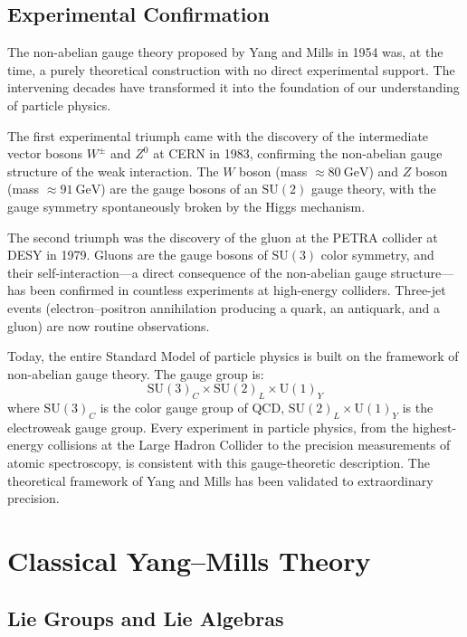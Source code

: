 \subsection{Experimental Confirmation}

The non-abelian gauge theory proposed by Yang and Mills in 1954 was, at the time, a purely theoretical construction with no direct experimental support. The intervening decades have transformed it into the foundation of our understanding of particle physics.

The first experimental triumph came with the discovery of the intermediate vector bosons $W^\pm$ and $Z^0$ at CERN in 1983, confirming the non-abelian gauge structure of the weak interaction. The $W$ boson (mass $\approx 80~\mathrm{GeV}$) and $Z$ boson (mass $\approx 91~\mathrm{GeV}$) are the gauge bosons of an $\mathrm{SU}(2)$ gauge theory, with the gauge symmetry spontaneously broken by the Higgs mechanism.

The second triumph was the discovery of the gluon at the PETRA collider at DESY in 1979. Gluons are the gauge bosons of $\mathrm{SU}(3)$ color symmetry, and their self-interaction---a direct consequence of the non-abelian gauge structure---has been confirmed in countless experiments at high-energy colliders. Three-jet events (electron--positron annihilation producing a quark, an antiquark, and a gluon) are now routine observations.

Today, the entire Standard Model of particle physics is built on the framework of non-abelian gauge theory. The gauge group is:
\[
\mathrm{SU}(3)_C \times \mathrm{SU}(2)_L \times \mathrm{U}(1)_Y
\]
where $\mathrm{SU}(3)_C$ is the color gauge group of QCD, $\mathrm{SU}(2)_L \times \mathrm{U}(1)_Y$ is the electroweak gauge group. Every experiment in particle physics, from the highest-energy collisions at the Large Hadron Collider to the precision measurements of atomic spectroscopy, is consistent with this gauge-theoretic description. The theoretical framework of Yang and Mills has been validated to extraordinary precision.

\section{Classical Yang--Mills Theory}

\subsection{Lie Groups and Lie Algebras}

